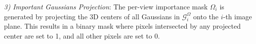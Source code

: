 
\noindent \textit{3) Important Gaussians Projection}:
The per-view importance mask $\Omega_i$ is generated by projecting the 3D centers of all Gaussians in $\mathcal{G}^{\Omega}_i$ onto the $i$-th image plane. This results in a binary mask where pixels intersected by any projected center are set to 1, and all other pixels are set to 0.

